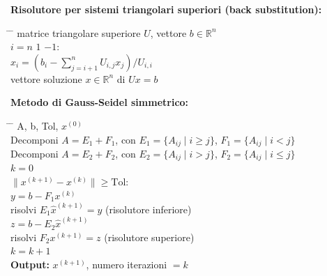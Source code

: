 \documentclass[12pt,a4paper]{article}
\begin{document}
\begin{flushleft}
\textbf{Risolutore per sistemi triangolari superiori (back substitution):}
\begin{tabbing}
\hspace{1.5cm} \= \hspace{10cm} \= \kill
{} matrice triangolare superiore \( U \), vettore \( b \in \mathbb{R}^n \) \\
 \( i = n \)  \( 1 \)  \( -1 \): \\
\> \( x_i = \left(b_i - \sum_{j=i+1}^{n} U_{i,j} x_j\right) / U_{i,i} \) \\
 vettore soluzione \( x \in \mathbb{R}^n \) di \( Ux = b \) 
\end{tabbing}
\end{flushleft}
\begin{flushleft}
\textbf{Metodo di Gauss-Seidel simmetrico:}
\begin{tabbing}
\hspace{1.5cm} \= \hspace{10cm} \= \kill
{} A, b, Tol, \( x^{(0)} \) \\
Decomponi \( A = E_1 + F_1 \), con \( E_1 = \{A_{ij} \mid i \ge j\} \), \( F_1 = \{A_{ij} \mid i < j\} \) \\
Decomponi \( A = E_2 + F_2 \), con \( E_2 = \{A_{ij} \mid i > j\} \), \( F_2 = \{A_{ij} \mid i \le j\} \) \\
\( k = 0 \) \\
 \( \|x^{(k+1)} - x^{(k)}\| \ge \text{Tol} \): \\
\> \( y = b - F_1 x^{(k)} \) \\
\> risolvi \( E_1 \hat{x}^{(k+1)} = y \) (risolutore inferiore) \\
\> \( z = b - E_2 \hat{x}^{(k+1)} \) \\
\> risolvi \( F_2 x^{(k+1)} = z \) (risolutore superiore) \\
\> \( k = k + 1 \) \\
\textbf{Output:} \( x^{(k+1)} \), numero iterazioni \( = k \)
\end{tabbing}
\end{flushleft}

\newpage
\thispagestyle{empty}
\end{document}
